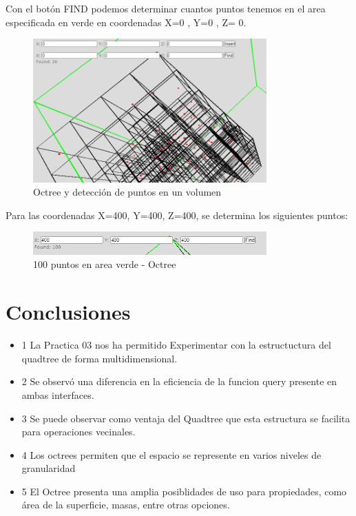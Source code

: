 \documentclass{article}
\begin{document}
Con el botón FIND podemos determinar cuantos puntos tenemos en el area especificada en verde en coordenadas X=0 , Y=0 , Z= 0.

\begin{figure}[H]
\centering
\includegraphics[width=0.8\textwidth]{img/oct_100verde.png}
\caption{Octree y detección de puntos en un volumen}
\end{figure}

Para las coordenadas X=400, Y=400, Z=400, se determina los siguientes puntos:

\begin{figure}[H]
\centering
\includegraphics[width=0.8\textwidth]{img/oct_found100.png}
\caption{100 puntos en area verde - Octree}
\end{figure}

\section{Conclusiones}

\begin{itemize}
            \item 1 La Practica 03 nos ha permitido Experimentar con la estructuctura del quadtree de forma multidimensional.
\end{itemize}
\begin{itemize}
            \item 2 Se observó una diferencia en la eficiencia de la funcion query presente en ambas interfaces.
\end{itemize}

\begin{itemize}
            \item 3 Se puede observar como ventaja del Quadtree que esta estructura se facilita para operaciones vecinales.
\end{itemize}    
\begin{itemize}
            \item 4 Los octrees permiten que el espacio se represente en varios niveles de granularidad
\end{itemize}
\begin{itemize}
            \item 5 El Octree presenta una amplia posiblidades de uso para propiedades, como área de la superficie, masas, entre otras opciones.
\end{itemize}

	
	
	
\end{document}
